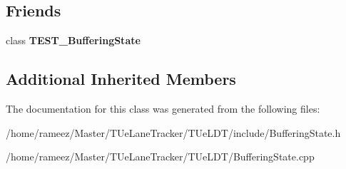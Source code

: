 \subsection*{Friends}
\begin{DoxyCompactItemize}
\item 
\hypertarget{classBufferingState_ae434ad700893dfcec0c63fdb5a1b7d54}{class {\bfseries T\-E\-S\-T\-\_\-\-Buffering\-State}}\label{classBufferingState_ae434ad700893dfcec0c63fdb5a1b7d54}

\end{DoxyCompactItemize}
\subsection*{Additional Inherited Members}


The documentation for this class was generated from the following files\-:\begin{DoxyCompactItemize}
\item 
/home/rameez/\-Master/\-T\-Ue\-Lane\-Tracker/\-T\-Ue\-L\-D\-T/include/Buffering\-State.\-h\item 
/home/rameez/\-Master/\-T\-Ue\-Lane\-Tracker/\-T\-Ue\-L\-D\-T/Buffering\-State.\-cpp\end{DoxyCompactItemize}
